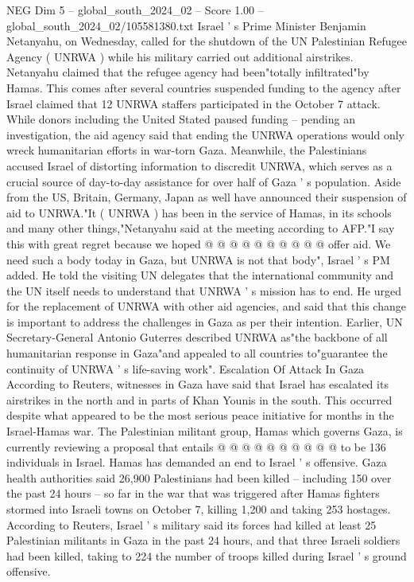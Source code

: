 \begin{textsample}{NEG Dim 5 – global\_south\_2024\_02 – Score 1.00 – global\_south\_2024\_02/105581380.txt}  \label{ex:f5_neg_305}
Israel ' s Prime Minister Benjamin Netanyahu, on Wednesday, called for the shutdown of the UN Palestinian Refugee Agency ( UNRWA ) while his military carried out additional airstrikes.
Netanyahu claimed that the refugee agency had been"totally infiltrated"by Hamas.
This comes after several countries suspended funding to the agency after Israel claimed that 12 UNRWA staffers participated in the October 7 attack.
While donors including the United Stated paused funding -- pending an investigation, the aid agency said that ending the UNRWA operations would only wreck humanitarian efforts in war-torn Gaza.
Meanwhile, the Palestinians accused Israel of distorting information to discredit UNRWA, which serves as a crucial source of day-to-day assistance for over half of Gaza ' s population.
Aside from the US, Britain, Germany, Japan as well have announced their suspension of aid to UNRWA."It ( UNRWA ) has been in the service of Hamas, in its schools and many other things,"Netanyahu said at the meeting according to AFP."I say this with great regret because we hoped @ @ @ @ @ @ @ @ @ @ offer aid.
We need such a body today in Gaza, but UNRWA is not that body", Israel ' s PM added.
He told the visiting UN delegates that the international community and the UN itself needs to understand that UNRWA ' s mission has to end.
He urged for the replacement of UNRWA with other aid agencies, and said that this change is important to address the challenges in Gaza as per their intention.
Earlier, UN Secretary-General Antonio Guterres described UNRWA as"the backbone of all humanitarian response in Gaza"and appealed to all countries to"guarantee the continuity of UNRWA ' s life-saving work".
Escalation Of Attack In Gaza According to Reuters, witnesses in Gaza have said that Israel has escalated its airstrikes in the north and in parts of Khan Younis in the south.
This occurred despite what appeared to be the most serious peace initiative for months in the Israel-Hamas war.
The Palestinian militant group, Hamas which governs Gaza, is currently reviewing a proposal that entails @ @ @ @ @ @ @ @ @ @ to be 136 individuals in Israel.
Hamas has demanded an end to Israel ' s offensive.
Gaza health authorities said 26,900 Palestinians had been killed -- including 150 over the past 24 hours -- so far in the war that was triggered after Hamas fighters stormed into Israeli towns on October 7, killing 1,200 and taking 253 hostages.
According to Reuters, Israel ' s military said its forces had killed at least 25 Palestinian militants in Gaza in the past 24 hours, and that three Israeli soldiers had been killed, taking to 224 the number of troops killed during Israel ' s ground offensive.

\end{textsample}
